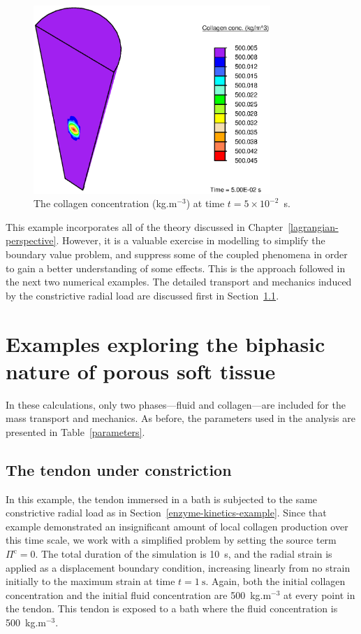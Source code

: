 \begin{figure}[!hpt]
\centering
\includegraphics[width=0.8\textwidth]{images/examples/lagrangian/medication/final-collagen-concentration}
\caption{The collagen concentration (kg.m$^{-3}$) at time
  $t=5\times10^{-2}$~s.}
\label{eg3conc}
\end{figure}

This example incorporates all of the theory discussed in
Chapter~\ref{lagrangian-perspective}. However, it is a valuable
exercise in modelling to simplify the boundary value problem, and
suppress some of the coupled phenomena in order to gain a better
understanding of some effects. This is the approach followed in the
next two numerical examples. The detailed transport and mechanics
induced by the constrictive radial load are discussed first in
Section~\ref{constriction-1}.

\section{Examples exploring the biphasic nature of porous soft tissue}
\label{biphasic-examples-1}

In these calculations, only two phases---fluid and collagen---are
included for the mass transport and mechanics. As before, the
parameters used in the analysis are presented in
Table~\ref{parameters}.

\subsection{The tendon under constriction}
\label{constriction-1}

In this example, the tendon immersed in a bath is subjected to the
same constrictive radial load as in
Section~\ref{enzyme-kinetics-example}. Since that example demonstrated
an insignificant amount of local collagen production over this time
scale, we work with a simplified problem by setting the source term
$\Pi^\mathrm{c} = 0$. The total duration of the simulation is 10~s,
and the radial strain is applied as a displacement boundary condition,
increasing linearly from no strain initially to the maximum strain at
time $t = 1~\mathrm{s}$. Again, both the initial collagen
concentration and the initial fluid concentration are 500~kg.m$^{-3}$
at every point in the tendon. This tendon is exposed to a bath where
the fluid concentration is 500~kg.m$^{-3}$.

